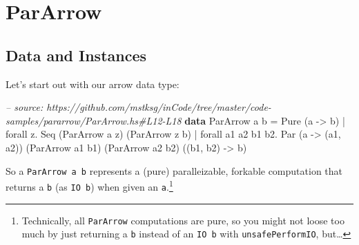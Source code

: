 \documentclass[]{article}
\newenvironment{Shaded}{}{}
\newcommand{\KeywordTok}[1]{\textcolor[rgb]{0.00,0.44,0.13}{\textbf{#1}}}
\newcommand{\DataTypeTok}[1]{\textcolor[rgb]{0.56,0.13,0.00}{#1}}
\newcommand{\CommentTok}[1]{\textcolor[rgb]{0.38,0.63,0.69}{\textit{#1}}}
\newcommand{\OtherTok}[1]{\textcolor[rgb]{0.00,0.44,0.13}{#1}}
\newcommand{\FunctionTok}[1]{\textcolor[rgb]{0.02,0.16,0.49}{#1}}
\newcommand{\NormalTok}[1]{#1}
\begin{document}
\section{ParArrow}\label{pararrow}

\subsection{Data and Instances}\label{data-and-instances}

Let's start out with our arrow data type:

\begin{Shaded}
\begin{Highlighting}[]
\CommentTok{-- source: https://github.com/mstksg/inCode/tree/master/code-samples/pararrow/ParArrow.hs#L12-L18}
\KeywordTok{data} \DataTypeTok{ParArrow}\NormalTok{ a b }\FunctionTok{=}                     \DataTypeTok{Pure}\NormalTok{  (a }\OtherTok{->}\NormalTok{ b)}
                  \FunctionTok{|}\NormalTok{ forall z}\FunctionTok{.}           \DataTypeTok{Seq}\NormalTok{   (}\DataTypeTok{ParArrow}\NormalTok{ a z)}
\NormalTok{                                              (}\DataTypeTok{ParArrow}\NormalTok{ z b)}
                  \FunctionTok{|}\NormalTok{ forall a1 a2 b1 b2}\FunctionTok{.} \DataTypeTok{Par}\NormalTok{   (a }\OtherTok{->}\NormalTok{ (a1, a2))}
\NormalTok{                                              (}\DataTypeTok{ParArrow}\NormalTok{ a1 b1)}
\NormalTok{                                              (}\DataTypeTok{ParArrow}\NormalTok{ a2 b2)}
\NormalTok{                                              ((b1, b2) }\OtherTok{->}\NormalTok{ b)}
\end{Highlighting}
\end{Shaded}

So a \texttt{ParArrow\ a\ b} represents a (pure) paralleizable, forkable
computation that returns a \texttt{b} (as \texttt{IO\ b}) when given an
\texttt{a}.\footnote{Technically, all \texttt{ParArrow} computations are pure,
  so you might not loose too much by just returning a \texttt{b} instead of an
  \texttt{IO\ b} with \texttt{unsafePerformIO}, but\ldots{}}
\end{document}
